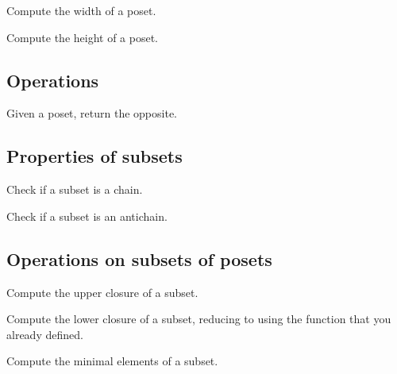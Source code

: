 \begin{exercise}
Compute the width of a poset.
\end{exercise}

\begin{exercise}
Compute the height of a poset.
\end{exercise}

\subsection{Operations}


\begin{exercise}
Given a poset, return the opposite.
\end{exercise}

\subsection{Properties of subsets}


\begin{exercise}
Check if a subset is a chain.
\end{exercise}

\begin{exercise}
Check if a subset is an antichain.
\end{exercise}

\subsection{Operations on subsets of posets}

\begin{exercise}
Compute the upper closure of a subset.

\end{exercise}


\begin{exercise}
Compute the lower closure of a subset, reducing to
using the function  that you
already defined.

\end{exercise}



\begin{exercise}
Compute the minimal elements of a subset.


\end{exercise}


